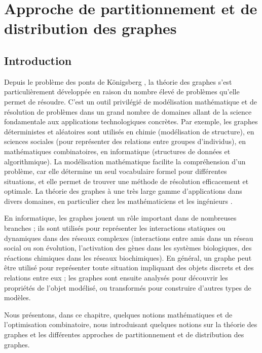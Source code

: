 \chapter{Approche de partitionnement et de distribution des graphes}
	\minitoc
	\newpage

\section{Introduction} 
Depuis le problème des ponts de Königsberg \citep{EULER1736}, la théorie des graphes s'est particulièrement développée en raison du nombre élevé de problèmes qu'elle permet de résoudre. C'est un outil privilégié de modélisation mathématique et de résolution de problèmes dans un grand nombre de domaines allant de la science fondamentale aux applications technologiques concrètes. Par exemple, les graphes déterministes et aléatoires sont utilisés en chimie (modélisation de structure), en sciences sociales (pour représenter des relations entre groupes d’individus), en mathématiques combinatoires, en informatique (structures de données et algorithmique). La modélisation mathématique facilite la compréhension d'un problème, car elle détermine un seul vocabulaire formel pour différentes situations, et elle permet de trouver une méthode de résolution efficacement et optimale. La théorie des graphes à une très large gamme d'applications dans divers domaines, en particulier chez les mathématiciens et les ingénieurs \citep{DEO2017}.

En informatique, les graphes jouent un rôle important dans de nombreuses branches ; ils sont utilisés pour représenter les interactions statiques ou dynamiques dans des réseaux complexes (interactions entre amis dans un réseau social ou son évolution, l'activation des gènes dans les systèmes biologiques, des réactions chimiques dans les réseaux biochimiques). En général, un graphe peut être utilisé pour représenter toute situation impliquant des objets discrets et des relations entre eux ; les graphes sont ensuite analysés pour découvrir les propriétés de l'objet modélisé, ou transformés pour construire d'autres types de modèles.

Nous présentons, dans ce chapitre, quelques notions mathématiques et de l'optimisation combinatoire, nous introduisant quelques notions sur la théorie des graphes et les différentes approches de partitionnement et de distribution des graphes. 

